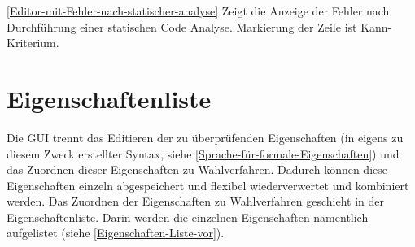 \documentclass[a4paper]{scrreprt}
\begin{document}
\ref{Editor-mit-Fehler-nach-statischer-analyse} Zeigt die Anzeige der Fehler nach Durchführung einer statischen Code Analyse. Markierung der Zeile ist Kann-Kriterium.

\section{Eigenschaftenliste}
Die GUI trennt das Editieren der zu überprüfenden Eigenschaften (in eigens zu diesem Zweck erstellter Syntax, siehe \ref{Sprache-für-formale-Eigenschaften}) und das Zuordnen dieser Eigenschaften zu Wahlverfahren. Dadurch können diese Eigenschaften einzeln abgespeichert und flexibel wiederverwertet und kombiniert werden. Das Zuordnen der Eigenschaften zu Wahlverfahren geschieht in der Eigenschaftenliste. Darin werden die einzelnen Eigenschaften namentlich aufgelistet (siehe \ref{Eigenschaften-Liste-vor}). 
\end{document}

